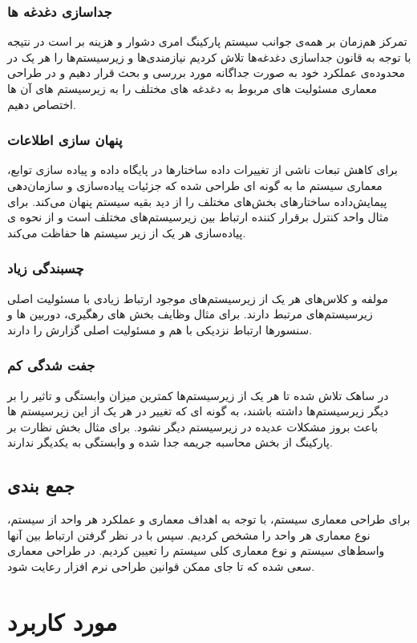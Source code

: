 \documentclass[oneside,a4paper,12pt]{book}
\begin{document}
	\subsection{جداسازی دغدغه ها}
	تمرکز هم‌زمان بر همه‌ی جوانب سیستم پارکینگ امری دشوار و هزینه بر است در نتیجه با توجه به قانون جداسازی
	دغدغه‌ها تلاش کردیم نیازمندی‌ها و زیرسیستم‌ها را هر یک در محدوده‌ی عملکرد خود به صورت جداگانه مورد بررسی و
	بحث قرار دهیم و در طراحی معماری مسئولیت های مربوط به دغدغه های مختلف را به زیرسیستم های آن ها اختصاص
	دهیم.
	
	\subsection{پنهان سازی اطلاعات}
	برای کاهش تبعات ناشی از تغییرات داده ساختارها در پایگاه داده و پیاده سازی توابع، معماری سیستم ما به گونه ای طراحی شده که جزئیات پیاده‌سازی و سازمان‌دهی پیمایش‌داده ساختارهای بخش‌های مختلف را از دید بقیه سیستم پنهان می‌کند. برای مثال واحد کنترل برقرار کننده ارتباط بین زیرسیستم‌های مختلف است و از نحوه ی پیاده‌سازی هر یک از زیر سیستم ها حفاظت می‌کند.
	
	\subsection{چسبندگی زیاد}
	\indent
	مولفه و کلاس‌های هر یک از زیرسیستم‌های موجود ارتباط زیادی با مسئولیت اصلی زیرسیستم‌های مرتبط دارند. برای مثال وظایف بخش های رهگیری، دوربین ها و سنسورها ارتباط نزدیکی با هم و مسئولیت اصلی گزارش را دارند.
	
	\subsection{جفت شدگی کم}
	در ساهک تلاش شده تا هر یک از زیرسیستم‌ها کمترین میزان وابستگی و تاثیر را بر دیگر زیرسیستم‌ها داشته باشند، به گونه ای که تغییر در هر یک از این زیرسیستم ها باعث بروز مشکلات عدیده در زیرسیستم دیگر نشود. برای مثال بخش نظارت بر پارکینگ از بخش محاسبه جریمه جدا شده و وابستگی به یکدیگر ندارند.
	
	\section{جمع بندی}
	برای طراحی معماری سیستم، با توجه به اهداف معماری و عملکرد هر واحد از سیستم، نوع معماری هر واحد را مشخص کردیم. سپس با در نظر گرفتن ارتباط بین آنها واسط‌های سیستم و نوع معماری کلی سیستم را تعیین کردیم. در طراحی معماری سعی شده که تا جای ممکن قوانین طراحی نرم افزار رعایت شود.
	
	
\chapter{مورد کاربرد}
\end{document}
